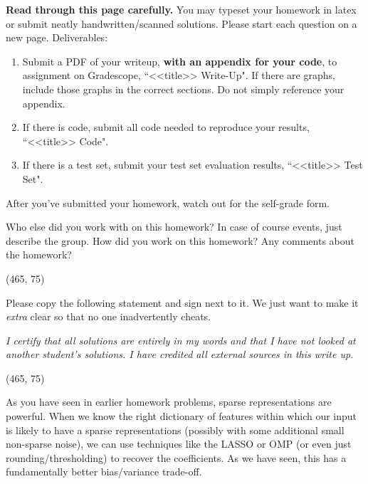 \documentclass[preview]{standalone}
\begin{document}
\fontsize{12}{15}\selectfont


\textbf{Read through this page carefully.} You may typeset your homework in latex or submit neatly handwritten/scanned solutions. Please start each question on a new page. Deliverables:

\begin{enumerate}
  \item Submit a PDF of your writeup, \textbf{with an appendix for your code}, to assignment on Gradescope, ``<<title>> Write-Up". If there are graphs, include those graphs in the correct sections. Do not simply reference your appendix.
  \item If there is code, submit all code needed to reproduce your results, ``<<title>> Code".
  \item If there is a test set, submit your test set evaluation results, ``<<title>> Test Set".
\end{enumerate}

After you've submitted your homework, watch out for the self-grade form.

\begin{Parts}

\Part Who else did you work with on this homework? In case of course events, just describe the group. How did you work on this homework? Any comments about the homework?

\vspace{15pt}
\framebox(465, 75){}

\Part Please copy the following statement and sign next to it. We just want to make it \textit{extra} clear so that no one inadvertently cheats.

\textit{I certify that all solutions are entirely in my words and that I have not looked at another student's solutions. I have credited all external sources in this write up.}

\vspace{15pt}
\framebox(465, 75){}

\end{Parts}

\pagebreak


As you have seen in earlier homework problems, sparse representations
are powerful. When we know the right dictionary of features within
which our input is likely to have a sparse representations (possibly
with some additional small non-sparse noise), we can use techniques
like the LASSO or OMP (or even just rounding/thresholding) to recover
the coefficients. As we have seen, this has a fundamentally better
bias/variance trade-off. 
\end{document}
